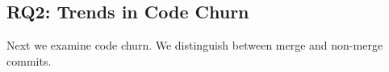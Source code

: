 


%





\subsection{RQ2: Trends in Code Churn}

Next we examine code churn.
We distinguish between merge and non-merge commits.

